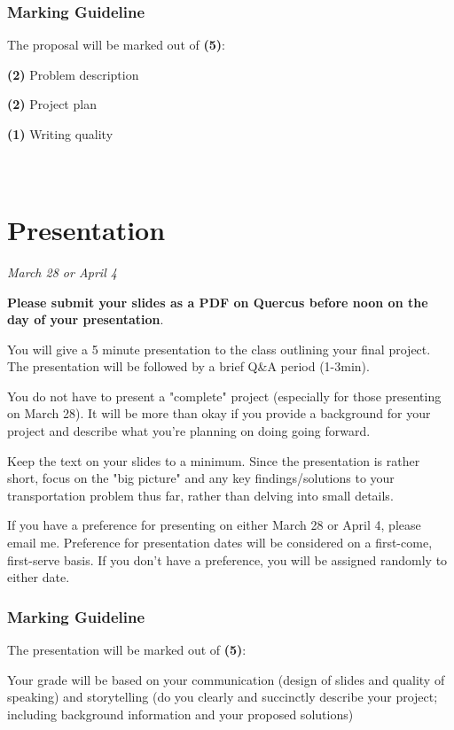 \documentclass[11pt]{article}
\begin{document}
	\subsubsection*{Marking Guideline}
	
	The proposal will be marked out of \textbf{(5)}:
	
	\textbf{(2)} Problem description
	
	\textbf{(2)} Project plan
	
	\textbf{(1)} Writing quality



	\newpage
	
	
	
	\section*{\\Presentation}
	
	\textit{March 28 or April 4}
	
	\textbf{Please submit your slides as a PDF on Quercus before noon on the day of your presentation}.
	
	You will give a 5 minute presentation to the class outlining your final project. The presentation will be followed by a brief Q\&A period (1-3min).
	
	You do not have to present a "complete" project (especially for those presenting on March 28). It will be more than okay if you provide a background for your project and describe what you're planning on doing going forward.
	
	Keep the text on your slides to a minimum. Since the presentation is rather short, focus on the "big picture" and any key findings/solutions to your transportation problem thus far, rather than delving into small details.
	
	If you have a preference for presenting on either March 28 or April 4, please email me. Preference for presentation dates will be considered on a first-come, first-serve basis. If you don't have a preference, you will be assigned randomly to either date.
	
	
	\subsubsection*{Marking Guideline}
	
	The presentation will be marked out of \textbf{(5)}:
	
	Your grade will be based on your communication (design of slides and quality of speaking) and storytelling (do you clearly and succinctly describe your project; including background information and your proposed solutions)
	
\end{document}
